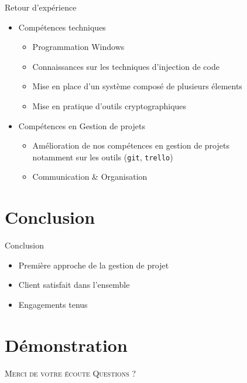 \documentclass{cubeamer}
\begin{document}
\begin{frame}{Retour d'expérience}
    \begin{itemize}
        \item Compétences techniques 
            \begin{itemize}
                \item Programmation Windows 
                \item Connaissances sur les techniques d'injection de code
                \item Mise en place d'un système composé de plusieurs élements
                \item Mise en pratique d'outils cryptographiques
            \end{itemize}
        \item Compétences en Gestion de projets
             \begin{itemize}
                \item Amélioration de nos compétences en gestion de projets \\
                  notamment sur les outils (\verb:git:, \verb:trello:)
                \item Communication \& Organisation
            \end{itemize}           
    \end{itemize}
\end{frame}

\section{Conclusion}

\begin{frame}{Conclusion}
    \begin{itemize}
        \item Première approche de la gestion de projet 
        \item Client satisfait dans l'ensemble
        \item Engagements tenus
    \end{itemize}
\end{frame}

\section{Démonstration}

\begin{frame}[standout]
    \Huge\textsc{Merci de votre écoute}
    \vfill
    \LARGE\textsc{Questions ?}
\end{frame}
\end{document}
